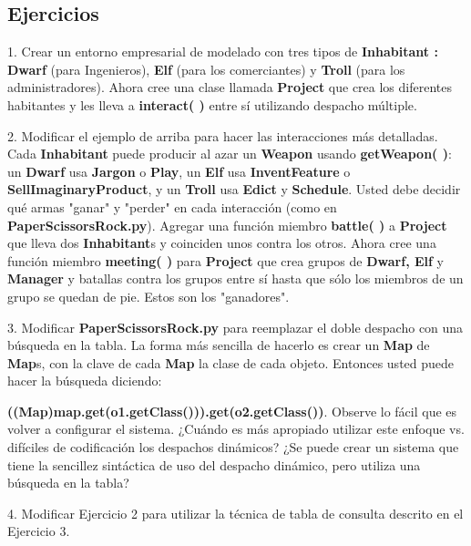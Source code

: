 \documentclass{article}
\begin{document}
\subsection{Ejercicios}

1. Crear un entorno empresarial de modelado con tres tipos de \textbf{Inhabitant : Dwarf} (para Ingenieros), \textbf{Elf} (para los comerciantes) y \textbf{Troll} (para los administradores). Ahora cree una clase llamada \textbf{Project} que crea los diferentes habitantes y les lleva a \textbf{interact( )} entre sí utilizando despacho múltiple.   \newline

2. Modificar el ejemplo de arriba para hacer las interacciones más detalladas. Cada \textbf{Inhabitant} puede producir al azar un \textbf{Weapon} usando \textbf{getWeapon( )}: un \textbf{Dwarf} usa \textbf{Jargon} o \textbf{Play}, un \textbf{Elf} usa \textbf{InventFeature} o \textbf{SellImaginaryProduct}, y un \textbf{Troll} usa \textbf{Edict} y \textbf{Schedule}. Usted debe decidir qué armas "ganar" y "perder" en cada interacción (como en \textbf{PaperScissorsRock.py}). Agregar una función miembro \textbf{battle( )} a \textbf{Project} que lleva dos \textbf{Inhabitant}s y coinciden unos contra los otros. Ahora cree una función miembro \textbf{meeting( )} para \textbf{Project} que crea grupos de \textbf{Dwarf, Elf} y \textbf{Manager} y batallas contra los grupos entre sí hasta que sólo los miembros de un grupo se quedan de pie.  Estos son los "ganadores".    \newline

3. Modificar \textbf{PaperScissorsRock.py} para reemplazar el doble despacho con una búsqueda en la tabla. La forma más sencilla de hacerlo es crear un \textbf{Map} de \textbf{Map}s, con la clave de cada \textbf{Map} la clase de cada objeto. Entonces usted puede hacer la búsqueda diciendo: \par
\textbf{((Map)map.get(o1.getClass())).get(o2.getClass())}. \newline
Observe lo fácil que es volver a configurar el sistema. ¿Cuándo es más apropiado utilizar este enfoque vs. difíciles de codificación los despachos dinámicos? ¿Se puede crear un sistema que tiene la sencillez sintáctica de uso del despacho dinámico, pero utiliza una búsqueda en la tabla?   \newline

4. Modificar Ejercicio 2 para utilizar la técnica de tabla de consulta descrito en el Ejercicio 3.     \newline
\end{document}
